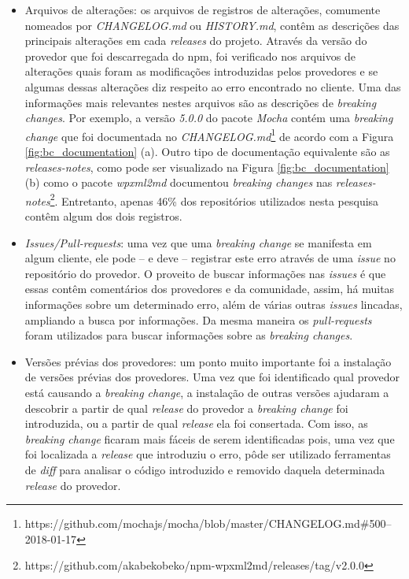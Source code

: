 \begin{itemize}
    \item Arquivos de alterações: os arquivos de registros de alterações, comumente nomeados por \textit{CHANGELOG.md} ou \textit{HISTORY.md}, contêm as descrições das principais alterações em cada \textit{releases} do projeto. Através da versão do provedor que foi descarregada do \gls{npm}, foi verificado nos arquivos de alterações quais foram as modificações introduzidas pelos provedores e se algumas dessas alterações diz respeito ao erro encontrado no cliente. Uma das informações mais relevantes nestes arquivos são as descrições de \textit{breaking changes}. Por exemplo, a versão \textit{5.0.0} do pacote \textit{Mocha} contém uma \textit{breaking change} que foi documentada no \textit{CHANGELOG.md}\footnote{https://github.com/mochajs/mocha/blob/master/CHANGELOG.md\#500--2018-01-17} de acordo com a Figura \ref{fig:bc_documentation} (a). Outro tipo de documentação equivalente são as \textit{releases-notes}, como pode ser visualizado na Figura \ref{fig:bc_documentation} (b) como o pacote \textit{wpxml2md} documentou \textit{breaking changes} nas \textit{releases-notes}\footnote{https://github.com/akabekobeko/npm-wpxml2md/releases/tag/v2.0.0}. Entretanto, apenas 46\% dos repositórios utilizados nesta pesquisa contêm algum dos dois registros.

    \item \textit{Issues/Pull-requests}: uma vez que uma \textit{breaking change} se manifesta em algum cliente, ele pode -- e deve -- registrar este erro através de uma \textit{issue} no repositório do provedor. O proveito de buscar informações nas \textit{issues} é que essas contêm comentários dos provedores e da comunidade, assim, há muitas informações sobre um determinado erro, além de várias outras \textit{issues} lincadas, ampliando a busca por informações. Da mesma maneira os \textit{pull-requests} foram utilizados para buscar informações sobre as \textit{breaking changes}.

    \item Versões prévias dos provedores: um ponto muito importante foi a instalação de versões prévias dos provedores. Uma vez que foi identificado qual provedor está causando a \textit{breaking change}, a instalação de outras versões ajudaram a descobrir a partir de qual \textit{release} do provedor a \textit{breaking change} foi introduzida, ou a partir de qual \textit{release} ela foi consertada. Com isso, as \textit{breaking change} ficaram mais fáceis de serem identificadas pois, uma vez que foi localizada a \textit{release} que introduziu o erro, pôde ser utilizado ferramentas de \textit{diff} para analisar o código introduzido e removido daquela determinada \textit{release} do provedor.


\end{itemize}
